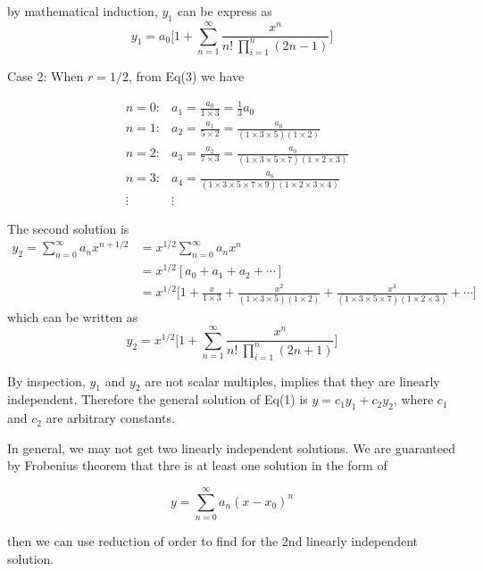 \begin{solution}
    by mathematical induction, $y_1$ can be express as 
    \[
        y_1 = a_0 \biggl[1 + \sum_{n=1}^{\infty} \frac{x^n}{n! \> \prod_{i=1}^{n} (2n-1) }\biggr]
    \]


    Case 2: When $r = 1/2$, from Eq(3) we have

    \begin{align*}
        &n = 0: &a_1 = \frac{a_0}{1 \times 3} = \frac{1}{3}a_0\\
        &n = 1: &a_2 = \frac{a_1}{5 \times 2} = \frac{a_0}{(1 \times 3 \times 5)(1 \times 2)}\\
        &n = 2: &a_3 = \frac{a_2}{7 \times 3} = \frac{a_0}{(1 \times 3 \times 5 \times 7)(1\times 2 \times 3)}\\
        &n = 3: &a_4 
        = \frac{a_0}{(1 \times 3 \times 5 \times 7 \times 9)(1 \times 2 \times 3 \times 4)}\\
        &\vdots &\vdots 
    \end{align*}

    The second solution is 
    \begin{align*}
        y_2 = \sum^\infty_{n=0} a_n x^{n+1/2} &= x^{1/2} \sum^\infty_{n=0} a_n x^n\\
        &= x^{1/2} [a_0 + a_1 + a_2 + \cdots]\\
        &= x^{1/2} \biggl[1 + \frac{x}{1 \times 3} + \frac{x^2}{(1\times 3 \times 5)(1 \times 2) 
        } + \frac{x^3}{(1 \times 3 \times 5 \times 7) (1 \times 2 \times 3)} + \cdots\biggr]
    \end{align*}
    which can be written as 
    \[
        y_2 = x^{1/2} \biggl[1 + \sum_{n=1}^{\infty} \frac{x^n}{n! \> \prod_{i=1}^{n} (2n+1) }\biggr]
    \]

    By inspection, $y_1$ and $y_2$ are not scalar multiples, implies that they are linearly independent.
    Therefore the general solution of Eq(1) is $y = c_1y_1 + c_2y_2$, where $c_1$ and $c_2$ are 
    arbitrary constants.
\end{solution}

\begin{remark}
    In general, we may not get two linearly independent solutions. We are guaranteed by 
    Frobenius theorem that thre is at least one solution in the form of 

    \begin{equation}
        y = \sum_{n=0}^{\infty} a_n (x-x_0)^n
    \end{equation}

    then we can use reduction of order to find for the 2nd linearly independent solution.
\end{remark}

